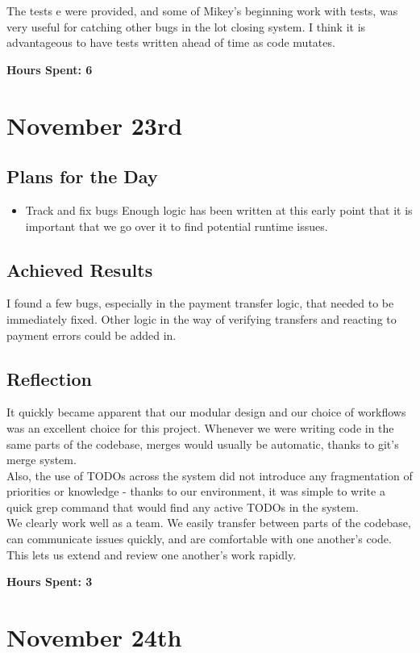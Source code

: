 \documentclass[titlepage, 12pt]{extarticle}
\begin{document}
The tests e were provided, and some of Mikey's beginning work with tests, was
very useful for catching other bugs in the lot closing system. I think it is
advantageous to have tests written ahead of time as code mutates.

{\bf Hours Spent: 6 }

\section{November 23rd}
\subsection{Plans for the Day}
\begin{itemize}
    \item Track and fix bugs
        Enough logic has been written at this early point that it is important
        that we go over it to find potential runtime issues.
\end{itemize}

\subsection{Achieved Results}
I found a few bugs, especially in the payment transfer logic, that needed to be
immediately fixed. Other logic in the way of verifying transfers and reacting
to payment errors could be added in.

\subsection{Reflection}
It quickly became apparent that our modular design and our choice of workflows
was an excellent choice for this project. Whenever we were writing code in the
same parts of the codebase, merges would usually be automatic, thanks to git's
merge system.\\

Also, the use of TODOs across the system did not introduce any fragmentation of
priorities or knowledge - thanks to our environment, it was simple to write a
quick grep command that would find any active TODOs in the system.\\

We clearly work well as a team. We easily transfer between parts of the
codebase, can communicate issues quickly, and are comfortable with one
another's code. This lets us extend and review one another's work rapidly.

{\bf Hours Spent: 3 }
\section{November 24th}
\end{document}
